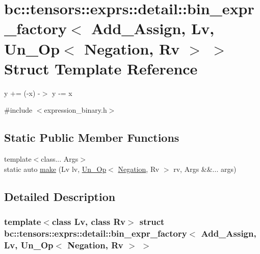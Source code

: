 \hypertarget{structbc_1_1tensors_1_1exprs_1_1detail_1_1bin__expr__factory_3_01Add__Assign_00_01Lv_00_01Un__Op_3_01Negation_00_01Rv_01_4_01_4}{}\section{bc\+:\+:tensors\+:\+:exprs\+:\+:detail\+:\+:bin\+\_\+expr\+\_\+factory$<$ Add\+\_\+\+Assign, Lv, Un\+\_\+\+Op$<$ Negation, Rv $>$ $>$ Struct Template Reference}
\label{structbc_1_1tensors_1_1exprs_1_1detail_1_1bin__expr__factory_3_01Add__Assign_00_01Lv_00_01Un__Op_3_01Negation_00_01Rv_01_4_01_4}


y += (-\/x) -\/$>$ y -\/= x  




{\ttfamily \#include $<$expression\+\_\+binary.\+h$>$}

\subsection*{Static Public Member Functions}
\begin{DoxyCompactItemize}
\item 
{\footnotesize template$<$class... Args$>$ }\\static auto \hyperlink{structbc_1_1tensors_1_1exprs_1_1detail_1_1bin__expr__factory_3_01Add__Assign_00_01Lv_00_01Un__Op_3_01Negation_00_01Rv_01_4_01_4_a9a226059ff726a8da6c8508ab621bb4f}{make} (Lv lv, \hyperlink{structbc_1_1tensors_1_1exprs_1_1Un__Op}{Un\+\_\+\+Op}$<$ \hyperlink{structbc_1_1oper_1_1Negation}{Negation}, Rv $>$ rv, Args \&\&... args)
\end{DoxyCompactItemize}


\subsection{Detailed Description}
\subsubsection*{template$<$class Lv, class Rv$>$\newline
struct bc\+::tensors\+::exprs\+::detail\+::bin\+\_\+expr\+\_\+factory$<$ Add\+\_\+\+Assign, Lv, Un\+\_\+\+Op$<$ Negation, Rv $>$ $>$}

